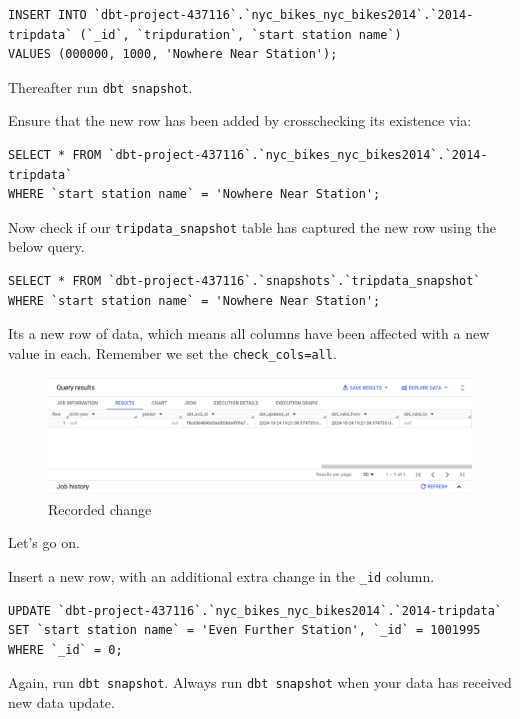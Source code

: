 \documentclass[
]{book}
\begin{document}
\begin{verbatim}
INSERT INTO `dbt-project-437116`.`nyc_bikes_nyc_bikes2014`.`2014-tripdata` (`_id`, `tripduration`, `start station name`) 
VALUES (000000, 1000, 'Nowhere Near Station');
\end{verbatim}

Thereafter run \texttt{dbt\ snapshot}.

Ensure that the new row has been added by crosschecking its existence via:

\begin{verbatim}
SELECT * FROM `dbt-project-437116`.`nyc_bikes_nyc_bikes2014`.`2014-tripdata`
WHERE `start station name` = 'Nowhere Near Station';
\end{verbatim}

Now check if our \texttt{tripdata\_snapshot} table has captured the new row using the below query.

\begin{verbatim}
SELECT * FROM `dbt-project-437116`.`snapshots`.`tripdata_snapshot`
WHERE `start station name` = 'Nowhere Near Station';
\end{verbatim}

Its a new row of data, which means all columns have been affected with a new value in each. Remember we set the \texttt{check\_cols=all}.

\begin{figure}
\centering
\includegraphics{./images/inserted_new_row.png}
\caption{Recorded change}
\end{figure}

Let's go on.

Insert a new row, with an additional extra change in the \texttt{\_id} column.

\begin{verbatim}
UPDATE `dbt-project-437116`.`nyc_bikes_nyc_bikes2014`.`2014-tripdata`
SET `start station name` = 'Even Further Station', `_id` = 1001995
WHERE `_id` = 0;
\end{verbatim}

Again, run \texttt{dbt\ snapshot}. Always run \texttt{dbt\ snapshot} when your data has received new data update.
\end{document}
